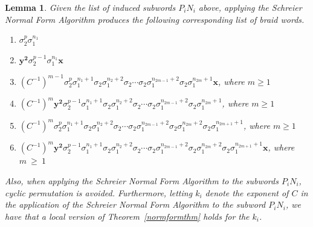 \documentclass{article}
\newtheorem{lemma}{Lemma}[section]
\begin{document}
\begin{lemma} \label{normlist} Given the list of induced subwords $P_{i}N_{i}$ above, applying the Schreier Normal Form Algorithm produces the following corresponding list of braid words. 
\begin{enumerate}
	\item[(1a)] $\sigma_{2}^{p}\sigma_{1}^{n_{1}}$
	\item[(1b)] $\mathbf{y^{2}}\sigma_{2}^{p-1}\sigma_{1}^{n_{1}}\mathbf{x}$
	\item[(2a)] $(C^{-1})^{m-1}\sigma_{2}^{p}\sigma_{1}^{n_{1}+1}\sigma_{2}\sigma_{1}^{n_{2}+2}\sigma_{2} \cdots \sigma_{2}\sigma_{1}^{n_{2m-1}+2}\sigma_{2}\sigma_{1}^{n_{2m}+1}\mathbf{x}$, where $m \geq 1$
	\item[(2b)] $(C^{-1})^{m}\mathbf{y^{2}}\sigma_{2}^{p-1}\sigma_{1}^{n_{1}+1}\sigma_{2}\sigma_{1}^{n_{2}+2}\sigma_{2} \cdots \sigma_{2}\sigma_{1}^{n_{2m-1}+2}\sigma_{2}\sigma_{1}^{n_{2m}+1}$, where $m \geq 1$
	\item[(3a)] $(C^{-1})^{m}\sigma_{2}^{p}\sigma_{1}^{n_{1}+1}\sigma_{2}\sigma_{1}^{n_{2}+2}\sigma_{2} \cdots \sigma_{2}\sigma_{1}^{n_{2m-1}+2}\sigma_{2}\sigma_{1}^{n_{2m}+2}\sigma_{2}\sigma_{1}^{n_{2m+1}+1}$, where $m \geq 1$
	\item[(3b)] $(C^{-1})^{m}\mathbf{y^{2}}\sigma_{2}^{p-1}\sigma_{1}^{n_{1}+1}\sigma_{2}\sigma_{1}^{n_{2}+2}\sigma_{2} \cdots \sigma_{2}\sigma_{1}^{n_{2m-1}+2}\sigma_{2}\sigma_{1}^{n_{2m}+2}\sigma_{2}\sigma_{1}^{n_{2m+1}+1}\mathbf{x}$, where $m~\geq~1$
\end{enumerate}
Also, when applying the Schreier Normal Form Algorithm to the subwords $P_{i}N_{i}$, cyclic permutation is avoided. Furthermore, letting $k_{i}$ denote the exponent of $C$ in the application of the Schreier Normal Form Algorithm to the subword $P_{i}N_{i}$, we have that a local version of Theorem~\ref{normformthm} holds for the $k_{i}$.
\end{lemma}
\end{document}
